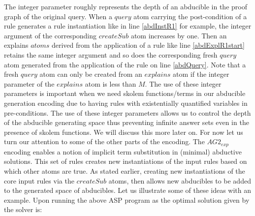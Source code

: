 The integer parameter roughly
represents the depth of an abducible in the proof graph of the original
query. When a $query$ atom carrying the post-condition of a rule generates a
rule instantiation like in line \ref{abdInstR1} for example, the integer argument of the
corresponding $createSub$ atom increases by one. Then an explains $atoms$
derived from the application of a rule like line \ref{abdExplR1start} retains the same integer
argument and so does the corresponding fresh $query$ atom generated from the
application of the rule on line \ref{abdQuery}. Note that a fresh $query$ atom can only be
created from an $explains$ atom if the integer parameter of the $explains$
atom is less than $M$. The use of these integer parameters is important
when we need skolem functions/terms in our abducible generation encoding due
to having rules with existentially quantified variables in pre-conditions. The
use of these integer parameters allows us to control the depth of the
abducible generating space thus preventing infinite answer sets even in the
presence of skolem functions. We will discuss this more later on. For now let
us turn our attention to some of the other parts of the encoding. The
$AG2_{exp}$ encoding enables a notion of implicit term substitution
in (minimal) abductive solutions. This set of rules creates new instantiations
of the input rules based on which other atoms are true. As stated earlier, creating new instantiations of the core input rules via the $createSub$ atoms, then allows
new abducibles to be added to the generated space of abducibles. Let us
illustrate some of these ideas with an example. Upon running the above ASP
program as the optimal solution given by the solver is: 

